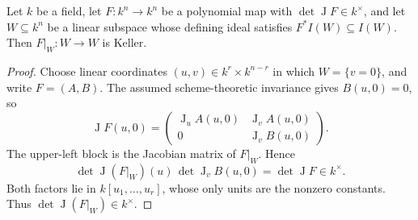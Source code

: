 \documentclass[10pt,a4paper]{amsart}
\DeclareMathOperator{\J}{J}
\begin{document}
\begin{lemma}\label{lem:restriction}
Let $k$ be a field, let $F\colon k^n\to k^n$ be a polynomial map with $\det\J F\in k^\times$, and let $W\subseteq k^n$ be a linear subspace whose defining ideal satisfies $F^*I(W)\subseteq I(W)$. Then $F|_W\colon W\to W$ is Keller.
\end{lemma}

\begin{proof}
Choose linear coordinates $(u,v)\in k^r\times k^{n-r}$ in which $W=\{v=0\}$, and write $F=(A,B)$. The assumed scheme-theoretic invariance gives $B(u,0)=0$, so
\[
\J F(u,0)=
\begin{pmatrix}
\J_uA(u,0)&\J_vA(u,0)\\
0&\J_vB(u,0)
\end{pmatrix}.
\]
The upper-left block is the Jacobian matrix of $F|_W$. Hence
\[
\det\J(F|_W)(u)\,\det\J_vB(u,0)=\det\J F\in k^\times.
\]
Both factors lie in $k[u_1,\ldots,u_r]$, whose only units are the nonzero constants. Thus $\det\J(F|_W)\in k^\times$.
\end{proof}
\end{document}
